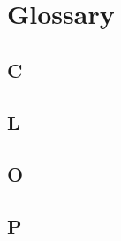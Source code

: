 


\chapter{Glossary}\label{glossary:cha}

\section*{C}
\begin{multicols}{2}

\end{multicols}

\section*{L}
\begin{multicols}{2}

\end{multicols}

\section*{O}
\begin{multicols}{2}

\end{multicols}

\section*{P}
\begin{multicols}{2}

\end{multicols}


